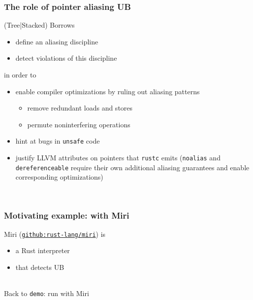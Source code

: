 \begin{frame}
    \frametitle{The role of pointer aliasing UB}
    (Tree|Stacked) Borrows
    \begin{itemize}
        \item define an aliasing discipline
        \item detect violations of this discipline
    \end{itemize}
    in order to
    \begin{itemize}
        \item enable compiler optimizations by ruling out aliasing patterns
            \begin{itemize}
                \item remove redundant loads and stores
                \item permute noninterfering operations
            \end{itemize}
        \item hint at bugs in \texttt{unsafe} code
        \item justify LLVM attributes on pointers that \texttt{rustc} emits
            (\texttt{noalias} and \texttt{dereferenceable} require their own
            additional aliasing guarantees and enable corresponding optimizations)
    \end{itemize}~\\
\end{frame}

\begin{frame}[fragile]
    \frametitle{Motivating example: with Miri}
    Miri (\href{https://github.com/rust-lang/miri}{\texttt{github:rust-lang/miri}}) is
    \begin{itemize}
        \item a Rust interpreter
        \item that detects UB
    \end{itemize}~\\

    Back to \texttt{demo}: run with Miri
\end{frame}

